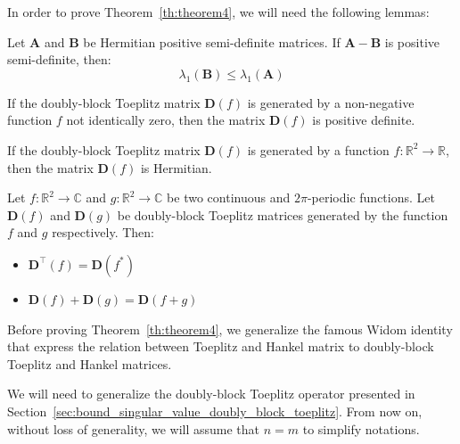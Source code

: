 In order to prove Theorem~\ref{th:theorem4}, we will need the following lemmas:

\begin{lemma} \label{appendix-th:diff_positive_semidefinite_matrices}
Let $\mathbf{A}$ and $\mathbf{B}$ be Hermitian positive semi-definite matrices. If $\mathbf{A} - \mathbf{B}$ is positive semi-definite, then:
\begin{equation*}
    \lambda_1 \left( \mathbf{B} \right) \leq \lambda_1 \left( \mathbf{A} \right)
\end{equation*}
\end{lemma}

\begin{lemma} \label{appendix-th:block_toeplitz_positive_definite}
If the doubly-block Toeplitz matrix $\mathbf{D}(f)$ is generated by a non-negative function $f$ not identically zero, then the matrix $\mathbf{D}(f)$ is positive definite. 
\end{lemma}

\begin{lemma} \label{appendix-th:block_toeplitz_hermitian}
If the doubly-block Toeplitz matrix $\mathbf{D}(f)$ is generated by a function $f: \mathbb{R}^2 \rightarrow \mathbb{R}$, then the matrix $\mathbf{D}(f)$ is Hermitian. 
\end{lemma}

\begin{lemma} \label{appendix-th:properties_block_toeplitz}
Let $f:\mathbb{R}^2 \rightarrow \mathbb{C}$ and $g:\mathbb{R}^2 \rightarrow \mathbb{C}$ be two continuous and $2\pi$-periodic functions. Let $\mathbf{D}(f)$ and $\mathbf{D}(g)$ be doubly-block Toeplitz matrices generated by the function $f$ and $g$ respectively. Then:
\begin{itemize}
    \item $\mathbf{D}^\top(f) = \mathbf{D}(f^*)$
    \item $\mathbf{D}(f) + \mathbf{D}(g) = \mathbf{D}(f + g)$
\end{itemize}
\end{lemma}

Before proving Theorem~\ref{th:theorem4}, we generalize the famous Widom identity \cite{widom1976asymptotic} that express the relation between Toeplitz and Hankel matrix to doubly-block Toeplitz and Hankel matrices. 

We will need to generalize the doubly-block Toeplitz operator presented in Section~\ref{sec:bound_singular_value_doubly_block_toeplitz}. From now on, without loss of generality, we will assume that $n=m$ to simplify notations. 

